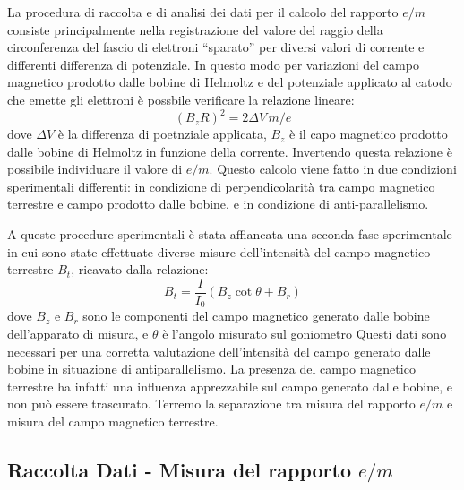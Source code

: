 \documentclass[a4paper,11pt]{article}
\newcommand{\virgolette}[1]{``#1''}
\begin{document}
		La procedura di raccolta e di analisi dei dati per il calcolo del rapporto $e/m$ consiste principalmente nella registrazione del valore del raggio della circonferenza del fascio di elettroni \virgolette{sparato} per diversi valori di corrente e differenti differenza di potenziale. In questo modo per variazioni del campo magnetico prodotto dalle bobine di Helmoltz e del potenziale applicato al catodo che emette gli elettroni è possbile verificare la relazione lineare:
		\begin{equation}\label{regressione}
		(B_z R)^2 = 2\Delta V \, m/e 
		\end{equation}
		dove $\Delta V$ è la differenza di poetnziale applicata, $B_z$ è il capo magnetico prodotto dalle bobine di Helmoltz in funzione della corrente. Invertendo questa relazione è possibile individuare il valore di $e/m$. Questo calcolo viene fatto in due condizioni sperimentali differenti: in condizione di perpendicolarità tra campo magnetico terrestre e campo prodotto dalle bobine, e in condizione di anti-parallelismo.
		
		A queste procedure sperimentali è stata affiancata una seconda fase sperimentale in cui sono state effettuate diverse misure dell'intensità del campo magnetico terrestre $B_t$, ricavato dalla relazione:
		\begin{equation}\label{B_terra}
		B_t= \frac{I}{I_0} (B_z \cot \theta + B_r) 
		\end{equation}
		dove $B_z$ e $B_r$ sono le componenti del campo magnetico generato dalle bobine dell'apparato di misura, e $\theta$ è l'angolo misurato sul goniometro
		Questi dati sono necessari per una corretta valutazione dell'intensità del campo generato dalle bobine in situazione di antiparallelismo. La presenza del campo magnetico terrestre ha infatti una influenza apprezzabile sul campo generato dalle bobine, e non può essere trascurato. Terremo la separazione tra misura del rapporto $e/m$ e misura del campo magnetico terrestre.
		
		\subsection{Raccolta Dati - Misura del rapporto $e/m$}
		
\end{document}
